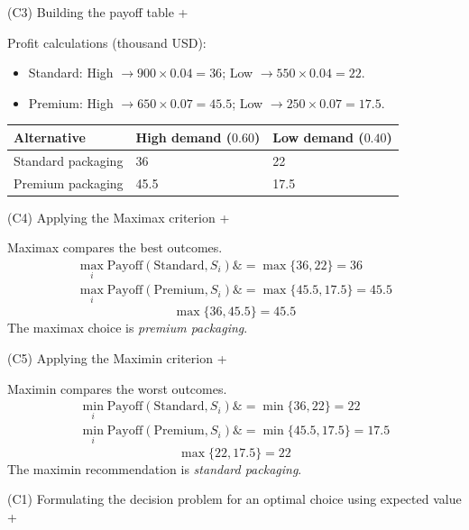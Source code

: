 \documentclass[11pt]{article}
\begin{document}
	
	
	
	
	
	(C3) Building the payoff table
	+
	
	
	Profit calculations (thousand USD):
	\begin{itemize}
		\item Standard: High $\to 900 \times 0.04 = 36$; Low $\to 550 \times 0.04 = 22$.
		\item Premium: High $\to 650 \times 0.07 = 45.5$; Low $\to 250 \times 0.07 = 17.5$.
	\end{itemize}
	
	\begin{center}
		\begin{tabular}{lll}
			\toprule
			Alternative & High demand
			($0.60$) & Low demand
			($0.40$) \\
			\midrule
			Standard packaging & 36 & 22 \\
			Premium packaging & 45.5 & 17.5 \\
			\bottomrule
		\end{tabular}
	\end{center}
	
	
	
	
	
	
	(C4) Applying the Maximax criterion
	+
	
	
	Maximax compares the best outcomes.
	\[
	\begin{aligned}
		\max_i \text{Payoff}(\text{Standard}, S_i) \&= \max\{36, 22\} = 36 \\
		\max_i \text{Payoff}(\text{Premium}, S_i) \&= \max\{45.5, 17.5\} = 45.5
	\end{aligned}
	\]
	\[
	\max\{36, 45.5\} = 45.5
	\]
	The maximax choice is \emph{premium packaging}.
	
	
	
	
	
	(C5) Applying the Maximin criterion
	+
	
	
	Maximin compares the worst outcomes.
	\[
	\begin{aligned}
		\min_i \text{Payoff}(\text{Standard}, S_i) \&= \min\{36, 22\} = 22 \\
		\min_i \text{Payoff}(\text{Premium}, S_i) \&= \min\{45.5, 17.5\} = 17.5
	\end{aligned}
	\]
	\[
	\max\{22, 17.5\} = 22
	\]
	The maximin recommendation is \emph{standard packaging}.
	
	
	
	
	
	(C1) Formulating the decision problem for an optimal choice using expected value
	+
	
\end{document}
